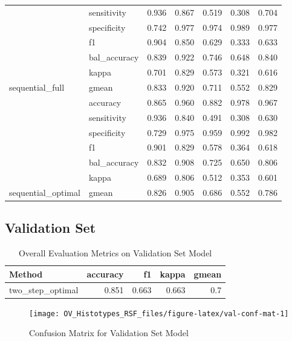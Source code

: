 \documentclass[
]{report}
\begin{document}
\begin{table}
\begin{tabular}[t]{l|l|r|r|r|r|r}
\cline{2-7}
 & sensitivity & 0.936 & 0.867 & 0.519 & 0.308 & 0.704\\
\cline{2-7}
 & specificity & 0.742 & 0.977 & 0.974 & 0.989 & 0.977\\
\cline{2-7}
 & f1 & 0.904 & 0.850 & 0.629 & 0.333 & 0.633\\
\cline{2-7}
 & bal\_accuracy & 0.839 & 0.922 & 0.746 & 0.648 & 0.840\\
\cline{2-7}
 & kappa & 0.701 & 0.829 & 0.573 & 0.321 & 0.616\\
\cline{2-7}
\multirow{-7}{*}{\raggedright\arraybackslash sequential\_full} & gmean & 0.833 & 0.920 & 0.711 & 0.552 & 0.829\\
\cline{1-7}
 & accuracy & 0.865 & 0.960 & 0.882 & 0.978 & 0.967\\
\cline{2-7}
 & sensitivity & 0.936 & 0.840 & 0.491 & 0.308 & 0.630\\
\cline{2-7}
 & specificity & 0.729 & 0.975 & 0.959 & 0.992 & 0.982\\
\cline{2-7}
 & f1 & 0.901 & 0.829 & 0.578 & 0.364 & 0.618\\
\cline{2-7}
 & bal\_accuracy & 0.832 & 0.908 & 0.725 & 0.650 & 0.806\\
\cline{2-7}
 & kappa & 0.689 & 0.806 & 0.512 & 0.353 & 0.601\\
\cline{2-7}
\multirow{-7}{*}{\raggedright\arraybackslash sequential\_optimal} & gmean & 0.826 & 0.905 & 0.686 & 0.552 & 0.786\\
\hline
\end{tabular}
\end{table}

\hypertarget{validation-set}{%
\subsection{Validation Set}\label{validation-set}}

\begin{table}

\caption{\label{tab:val-eval-overall}Overall Evaluation Metrics on Validation Set Model}
\centering
\begin{tabular}[t]{l|r|r|r|r}
\hline
Method & accuracy & f1 & kappa & gmean\\
\hline
two\_step\_optimal & 0.851 & 0.663 & 0.663 & 0.7\\
\hline
\end{tabular}
\end{table}

\begin{figure}[H]

{\centering \texttt{[image: OV\_Histotypes\_RSF\_files/figure-latex/val-conf-mat-1]} 

}

\caption{Confusion Matrix for Validation Set Model}\label{fig:val-conf-mat}
\end{figure}
\end{document}
